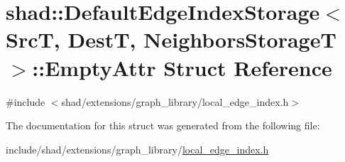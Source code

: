 \hypertarget{structshad_1_1DefaultEdgeIndexStorage_1_1EmptyAttr}{\section{shad\-:\-:Default\-Edge\-Index\-Storage$<$ Src\-T, Dest\-T, Neighbors\-Storage\-T $>$\-:\-:Empty\-Attr Struct Reference}
\label{structshad_1_1DefaultEdgeIndexStorage_1_1EmptyAttr}
}


{\ttfamily \#include $<$shad/extensions/graph\-\_\-library/local\-\_\-edge\-\_\-index.\-h$>$}



The documentation for this struct was generated from the following file\-:\begin{DoxyCompactItemize}
\item 
include/shad/extensions/graph\-\_\-library/\hyperlink{local__edge__index_8h}{local\-\_\-edge\-\_\-index.\-h}\end{DoxyCompactItemize}
